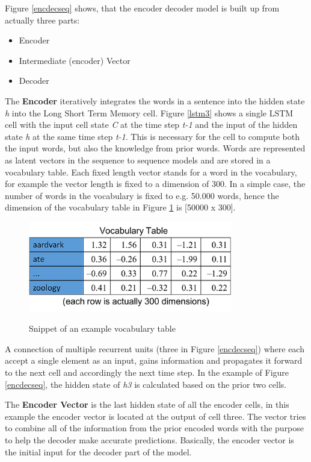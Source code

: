 Figure \ref{encdecseq} shows, that the encoder decoder model is built up from actually three parts:

\begin{itemize}
	\item Encoder
	\item Intermediate (encoder) Vector
	\item Decoder
\end{itemize}


The \textbf{Encoder} iteratively integrates the words in a sentence into the hidden state \textit{h} into the Long Short Term Memory cell.
Figure \ref{lstm3} shows a single LSTM cell with the input cell state \textit{C} at the time step \textit{t-1}  and the input of the hidden state \textit{h} at the same time step \textit{t-1}. This is necessary for the cell to compute both the input words, but also the knowledge from prior words. Words are represented as latent vectors in the sequence to sequence models and are stored in a vocabulary table. Each fixed length vector stands for a word in the vocabulary, for example the vector length is fixed to a dimension of 300. In a simple case, the number of words in the vocabulary is fixed to e.g. 50.000 words, hence the dimension of the vocabulary table in Figure \ref{voctable} is [50000 x 300]. 

\begin{figure}
	\begin{center}
		\includegraphics[width=3.5in]{photos/w1-16}\\
		\caption{Snippet of an example vocabulary table \cite{mugan}}\label{voctable}
	\end{center}
\end{figure}

A connection of multiple recurrent units (three in Figure \ref{encdecseq}) where each accept a single element as an input, gains information and propagates it forward to the next cell and accordingly the next time step. In the example of Figure \ref{encdecseq}, the hidden state of \textit{h3} is calculated based on the prior two cells.


The \textbf{Encoder Vector} is the last hidden state of all the encoder cells, in this example the encoder vector is located at the output of cell three. The vector tries to combine all of the information from the prior encoded words with the purpose to help the decoder make accurate predictions. Basically, the encoder vector is the initial input for the decoder part of the model.

